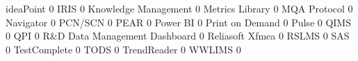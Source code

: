 \documentclass{article}
\begin{document}
\begin{Schunk}
\begin{Soutput}
  ideaPoint                                                                        0
  IRIS                                                                             0
  Knowledge Management                                                             0
  Metrics Library                                                                  0
  MQA Protocol                                                                     0
  Navigator                                                                        0
  PCN/SCN                                                                          0
  PEAR                                                                             0
  Power BI                                                                         0
  Print on Demand                                                                  0
  Pulse                                                                            0
  QIMS                                                                             0
  QPI                                                                              0
  R&D Data Management Dashboard                                                    0
  Reliasoft Xfmea                                                                  0
  RSLMS                                                                            0
  SAS                                                                              0
  TestComplete                                                                     0
  TODS                                                                             0
  TrendReader                                                                      0
  WWLIMS                                                                           0
                                                           

\end{Soutput}
\end{Schunk}
\end{document}

